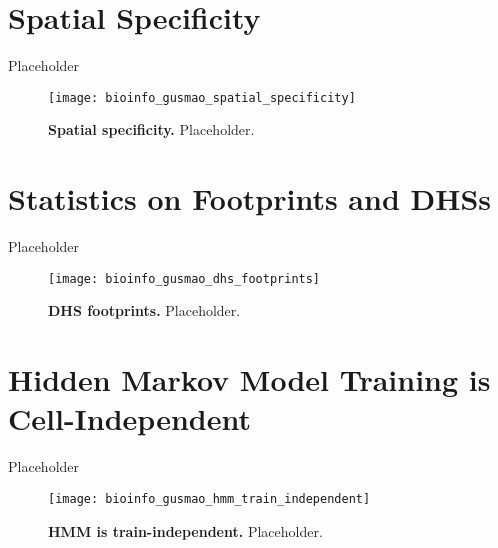 
\section{Spatial Specificity}
\label{sec:spatial.specificity}

Placeholder

\begin{figure}[h!]
\centering
\texttt{[image: bioinfo\_gusmao\_spatial\_specificity]}
\caption[Spatial specificity]{\textbf{Spatial specificity.} Placeholder.}
\label{fig:bioinfo_gusmao_spatial_specificity}
\end{figure}

\section{Statistics on Footprints and DHSs}
\label{sec:statistics.footprints.dhs}

Placeholder

\begin{figure}[h!]
\centering
\texttt{[image: bioinfo\_gusmao\_dhs\_footprints]}
\caption[DHS footprints]{\textbf{DHS footprints.} Placeholder.}
\label{fig:bioinfo_gusmao_dhs_footprints}
\end{figure}

\section{Hidden Markov Model Training is Cell-Independent}
\label{sec:hmm.training.cell.independent}

Placeholder

\begin{figure}[h!]
\centering
\texttt{[image: bioinfo\_gusmao\_hmm\_train\_independent]}
\caption[HMM is train-independent]{\textbf{HMM is train-independent.} Placeholder.}
\label{fig:bioinfo_gusmao_hmm_train_independent}
\end{figure}

